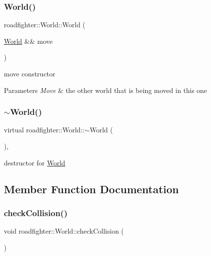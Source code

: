 \subsubsection{\texorpdfstring{World()}{World()}\hspace{0.1cm}{\footnotesize\ttfamily [3/3]}}
{\footnotesize\ttfamily roadfighter\+::\+World\+::\+World (\begin{DoxyParamCaption}\item[{\hyperlink{classroadfighter_1_1World}{World} \&\&}]{move }\end{DoxyParamCaption})\hspace{0.3cm}{\ttfamily [default]}}

move constructor 
\begin{DoxyParams}{Parameters}
{\em Move} & the other world that is being moved in this one \\
\hline
\end{DoxyParams}
\mbox{\label{classroadfighter_1_1World_aea82fc8fead2cfb0032de65b1a198058}} 
\subsubsection{\texorpdfstring{$\sim$\+World()}{~World()}}
{\footnotesize\ttfamily virtual roadfighter\+::\+World\+::$\sim$\+World (\begin{DoxyParamCaption}{ }\end{DoxyParamCaption})\hspace{0.3cm}{\ttfamily [virtual]}, {\ttfamily [default]}}

destructor for \hyperlink{classroadfighter_1_1World}{World} 

\subsection{Member Function Documentation}
\mbox{\label{classroadfighter_1_1World_ad04348a1285e8246abfacf32b600866f}} 
\subsubsection{\texorpdfstring{check\+Collision()}{checkCollision()}}
{\footnotesize\ttfamily void roadfighter\+::\+World\+::check\+Collision (\begin{DoxyParamCaption}{ }\end{DoxyParamCaption})}

